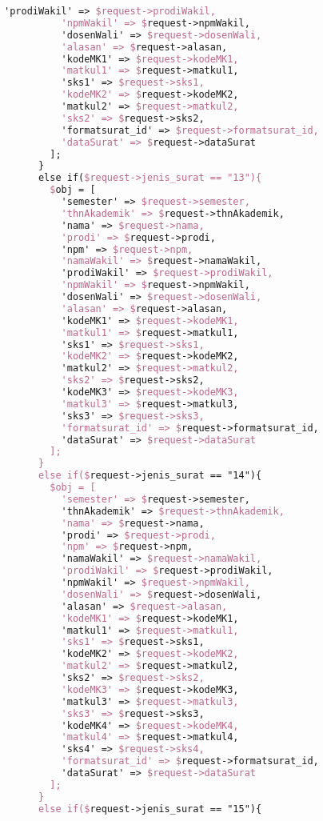 \begin{lstlisting}[language=tex,basicstyle=\tiny,caption=PesanansuratController.php]
          'prodiWakil' => $request->prodiWakil,
          'npmWakil' => $request->npmWakil,
          'dosenWali' => $request->dosenWali,
          'alasan' => $request->alasan,
          'kodeMK1' => $request->kodeMK1,
          'matkul1' => $request->matkul1,
          'sks1' => $request->sks1,
          'kodeMK2' => $request->kodeMK2,
          'matkul2' => $request->matkul2,
          'sks2' => $request->sks2,
          'formatsurat_id' => $request->formatsurat_id,
          'dataSurat' => $request->dataSurat
        ];
      }
      else if($request->jenis_surat == "13"){
        $obj = [
          'semester' => $request->semester,
          'thnAkademik' => $request->thnAkademik,
          'nama' => $request->nama,
          'prodi' => $request->prodi,
          'npm' => $request->npm,
          'namaWakil' => $request->namaWakil,
          'prodiWakil' => $request->prodiWakil,
          'npmWakil' => $request->npmWakil,
          'dosenWali' => $request->dosenWali,
          'alasan' => $request->alasan,
          'kodeMK1' => $request->kodeMK1,
          'matkul1' => $request->matkul1,
          'sks1' => $request->sks1,
          'kodeMK2' => $request->kodeMK2,
          'matkul2' => $request->matkul2,
          'sks2' => $request->sks2,
          'kodeMK3' => $request->kodeMK3,
          'matkul3' => $request->matkul3,
          'sks3' => $request->sks3,
          'formatsurat_id' => $request->formatsurat_id,
          'dataSurat' => $request->dataSurat
        ];
      }
      else if($request->jenis_surat == "14"){
        $obj = [
          'semester' => $request->semester,
          'thnAkademik' => $request->thnAkademik,
          'nama' => $request->nama,
          'prodi' => $request->prodi,
          'npm' => $request->npm,
          'namaWakil' => $request->namaWakil,
          'prodiWakil' => $request->prodiWakil,
          'npmWakil' => $request->npmWakil,
          'dosenWali' => $request->dosenWali,
          'alasan' => $request->alasan,
          'kodeMK1' => $request->kodeMK1,
          'matkul1' => $request->matkul1,
          'sks1' => $request->sks1,
          'kodeMK2' => $request->kodeMK2,
          'matkul2' => $request->matkul2,
          'sks2' => $request->sks2,
          'kodeMK3' => $request->kodeMK3,
          'matkul3' => $request->matkul3,
          'sks3' => $request->sks3,
          'kodeMK4' => $request->kodeMK4,
          'matkul4' => $request->matkul4,
          'sks4' => $request->sks4,
          'formatsurat_id' => $request->formatsurat_id,
          'dataSurat' => $request->dataSurat
        ];
      }
      else if($request->jenis_surat == "15"){

\end{lstlisting}
